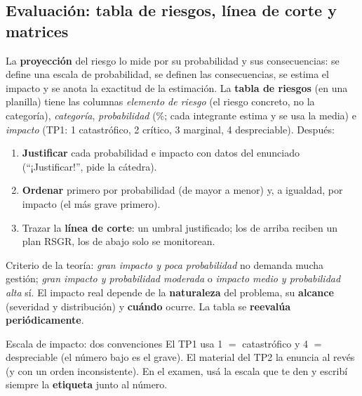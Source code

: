 \documentclass[11pt,a4paper]{article}
\begin{document}
\subsection{Evaluación: tabla de riesgos, línea de corte y matrices}
La \textbf{proyección} del riesgo lo mide por su probabilidad y sus consecuencias: se define una escala de
probabilidad, se definen las consecuencias, se estima el impacto y se anota la exactitud de la estimación. La
\textbf{tabla de riesgos} (en una planilla) tiene las columnas \emph{elemento de riesgo} (el riesgo concreto,
no la categoría), \emph{categoría}, \emph{probabilidad} (\%; cada integrante estima y se usa la media) e
\emph{impacto} (TP1: 1 catastrófico, 2 crítico, 3 marginal, 4 despreciable). Después:
\begin{enumerate}
  \item \textbf{Justificar} cada probabilidad e impacto con datos del enunciado (``¡Justificar!'', pide la cátedra).
  \item \textbf{Ordenar} primero por probabilidad (de mayor a menor) y, a igualdad, por impacto (el más grave
  primero).
  \item Trazar la \textbf{línea de corte}: un umbral justificado; los de arriba reciben un plan RSGR, los de
  abajo solo se monitorean.
\end{enumerate}
Criterio de la teoría: \emph{gran impacto y poca probabilidad} no demanda mucha gestión; \emph{gran impacto y
probabilidad moderada} o \emph{impacto medio y probabilidad alta} sí. El impacto real depende de la
\textbf{naturaleza} del problema, su \textbf{alcance} (severidad y distribución) y \textbf{cuándo} ocurre. La
tabla se \textbf{reevalúa periódicamente}.

\begin{aviso}{Escala de impacto: dos convenciones}
El TP1 usa 1 $=$ catastrófico y 4 $=$ despreciable (el número bajo es el grave). El material del TP2 la
enuncia al revés (y con un orden inconsistente). En el examen, usá la escala que te den y escribí siempre la
\textbf{etiqueta} junto al número.
\end{aviso}
\end{document}
